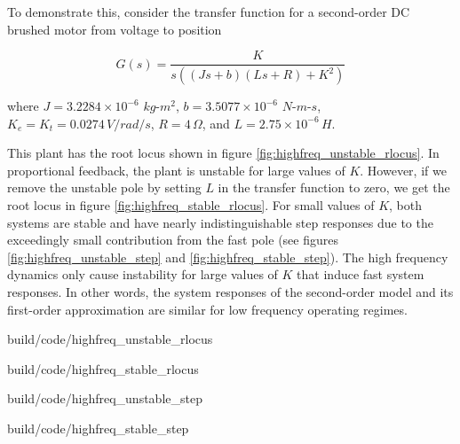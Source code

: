To demonstrate this, consider the transfer function for a second-order DC
brushed motor from voltage to position

\begin{equation*}
  G(s) = \frac{K}{s((Js + b)(Ls + R) + K^2)}
\end{equation*}

where $J = 3.2284 \times 10^{-6}$ $kg$-$m^2$, $b = 3.5077 \times 10^{-6}$
$N$-$m$-$s$, $K_e = K_t = 0.0274 \,V/rad/s$, $R = 4 \,\Omega$, and
$L = 2.75 \times 10^{-6} \,H$.

This plant has the root locus shown in figure
\ref{fig:highfreq_unstable_rlocus}. In proportional feedback, the plant is
unstable for large values of $K$. However, if we remove the unstable pole by
setting $L$ in the transfer function to zero, we get the root locus in figure
\ref{fig:highfreq_stable_rlocus}. For small values of $K$, both systems are
stable and have nearly indistinguishable step responses due to the exceedingly
small contribution from the fast pole (see figures
\ref{fig:highfreq_unstable_step} and \ref{fig:highfreq_stable_step}). The high
frequency dynamics only cause instability for large values of $K$ that induce
fast system responses. In other words, the system responses of the second-order
model and its first-order approximation are similar for low frequency operating
regimes.

\begin{bookfigure}
  \begin{minisvg}{build/code/highfreq_unstable_rlocus}
    \caption{Root locus of second-order DC brushed motor plant}
    \label{fig:highfreq_unstable_rlocus}
  \end{minisvg}
  \hfill
  \begin{minisvg}{build/code/highfreq_stable_rlocus}
    \caption{Root locus of first-order DC brushed motor plant}
    \label{fig:highfreq_stable_rlocus}
  \end{minisvg}
\end{bookfigure}

\begin{bookfigure}
  \begin{minisvg}{build/code/highfreq_unstable_step}
    \caption{Step response of second-order DC brushed motor plant}
    \label{fig:highfreq_unstable_step}
  \end{minisvg}
  \hfill
  \begin{minisvg}{build/code/highfreq_stable_step}
    \caption{Step response of first-order DC brushed motor plant}
    \label{fig:highfreq_stable_step}
  \end{minisvg}
\end{bookfigure}

